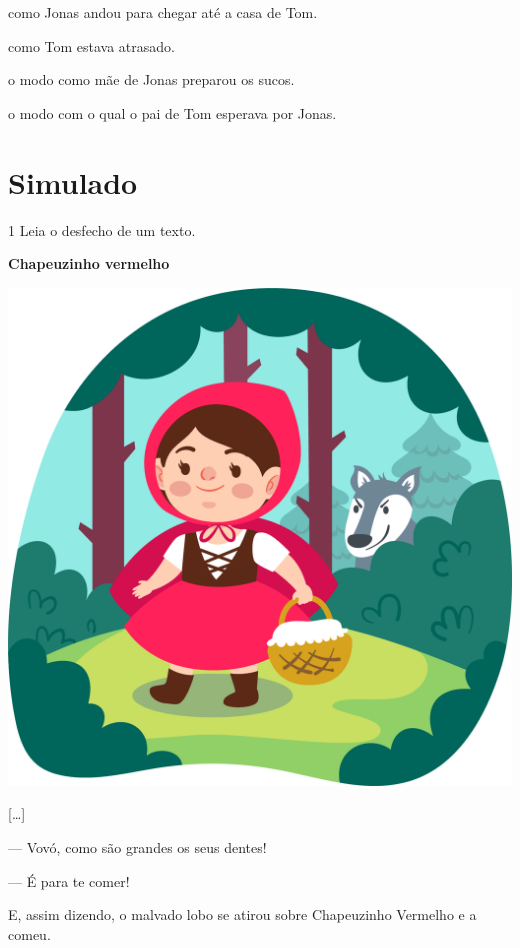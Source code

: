 \begin{escolha}
\item como Jonas andou para chegar até a casa de Tom.

\item como Tom estava atrasado.

\item o modo como mãe de Jonas preparou os sucos.

\item o modo com o qual o pai de Tom esperava por Jonas.
\end{escolha}


\chapter[Simulado 2]{Simulado}

\vspace*{-1.5cm}

\num{1} Leia o desfecho de um texto.

\begin{myquote}
\textbf{Chapeuzinho vermelho}

\begin{center}
\includegraphics[width=.5\textwidth]{./media/image23j.png}
\end{center}

{[}\ldots{}{]}

--- Vovó, como são grandes os seus dentes!

--- É para te comer!

E, assim dizendo, o malvado lobo se atirou sobre Chapeuzinho Vermelho e a
comeu.

\end{myquote}

